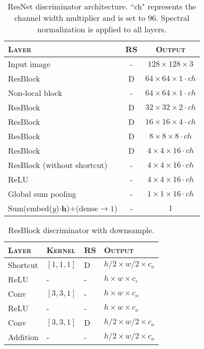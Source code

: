\documentclass{article}
\begin{document}
\begin{table}[h]
\centering
\caption{\label{tab:resnet_d_blocks}ResNet discriminator architecture. ``ch" represents the channel width multiplier and is set to $96$. Spectral normalization is applied to all layers. \vspace{0.2cm}}
\begin{tabular}{lcc}
\toprule
\textsc{Layer}           & \textsc{RS} & \textsc{Output} \\ \toprule
Input image &  - & $128\times128\times3$            \\\midrule
ResBlock   &   D &     $64\times64\times1 \cdot ch$       \\
Non-local block   &   - &     $64\times64\times1 \cdot ch$       \\
ResBlock   &   D &     $32\times32\times2\cdot ch$       \\
ResBlock   &   D &     $16\times16\times4\cdot ch$       \\
ResBlock   &   D &     $8\times8\times8\cdot ch$       \\
ResBlock   &   D &     $4\times4\times16\cdot ch$       \\
ResBlock (without shortcut)   &   - &     $4\times4\times16\cdot ch$       \\
ReLU & - & $4\times4\times16\cdot ch$       \\
Global sum pooling & - & $1\times1\times16\cdot ch$       \\ \midrule
Sum(embed($y$)$\cdot \bm{h}$)+(dense$\rightarrow 1$) & - &$1$\\ \bottomrule
\end{tabular}
\end{table}

\begin{table}[h]
 \centering
\caption{\label{tab:resblock_discriminator}ResBlock discriminator with downsample.\vspace{0.2cm}}
\begin{tabular}{llll}
  \toprule
      \textsc{Layer} & \textsc{Kernel}& \textsc{RS} & \textsc{Output} \\\toprule
      Shortcut & $[1,1,1]$ & D & $h/2 \times w/2 \times c_{o}$ \\ \midrule
      ReLU & - & - & $h \times w \times c_{i}$ \\
      Conv & $[3,3,1]$ & - & $h \times w \times c_{o}$ \\
      ReLU & - & - & $h \times w \times c_{o}$ \\
      Conv & $[3,3,1]$ & D & $h/2 \times w/2 \times c_{o}$ \\ \midrule
      Addition & - & - & $h/2 \times w/2 \times c_{o}$ \\ \bottomrule
    \end{tabular}
\end{table}
\end{document}
